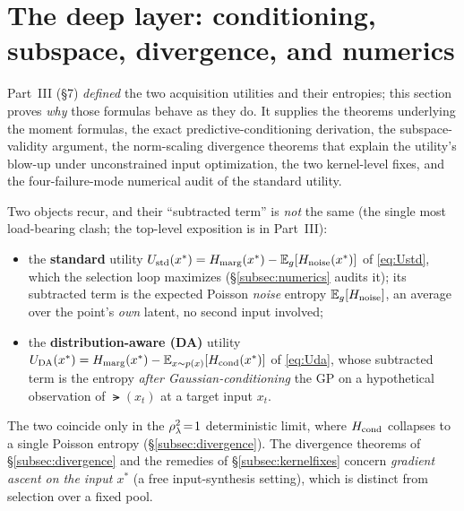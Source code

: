 
\section{The deep layer: conditioning, subspace, divergence, and numerics}
\label{sec:deeplayer}

Part~III (\S7) \emph{defined} the two acquisition utilities and their entropies;
this section proves \emph{why} those formulas behave as they do. It supplies the
theorems underlying the moment formulas, the exact predictive-conditioning
derivation, the subspace-validity argument, the norm-scaling divergence theorems
that explain the utility's blow-up under unconstrained input optimization, the
two kernel-level fixes, and the four-failure-mode numerical audit of the standard
utility.

Two objects recur, and their ``subtracted term'' is \emph{not} the same (the
single most load-bearing clash; the top-level exposition is in Part~III):
\begin{itemize}[leftmargin=1.4em]
  \item the \textbf{standard} utility
        $U_{\mathrm{std}}(x^*)=H_{\mathrm{marg}}(x^*)-\mathbb{E}_{g}[H_{\mathrm{noise}}(x^*)]$ of \eqref{eq:Ustd},
        which the selection loop maximizes (\S\ref{subsec:numerics} audits
        it); its subtracted term is the expected Poisson \emph{noise} entropy
        $\mathbb{E}_{g}[H_{\mathrm{noise}}]$, an average over the point's \emph{own} latent, no
        second input involved;
  \item the \textbf{distribution-aware (DA)} utility
        $U_{\mathrm{DA}}(x^*)=H_{\mathrm{marg}}(x^*)-\mathbb{E}_{x\sim p(x)}[H_{\mathrm{cond}}(x^*)]$ of \eqref{eq:Uda},
        whose subtracted term is the entropy \emph{after Gaussian-conditioning}
        the GP on a hypothetical observation of $\lat(x_t)$ at a target input
        $x_t$.
\end{itemize}
The two coincide only in the $\rho_{\lambda}^2\!=\!1$ deterministic limit, where $H_{\mathrm{cond}}$
collapses to a single Poisson entropy (\S\ref{subsec:divergence}). The divergence
theorems of \S\ref{subsec:divergence} and the remedies of
\S\ref{subsec:kernelfixes} concern \emph{gradient ascent on the input $x^*$}
(a free input-synthesis setting), which is distinct from selection over a fixed
pool.

